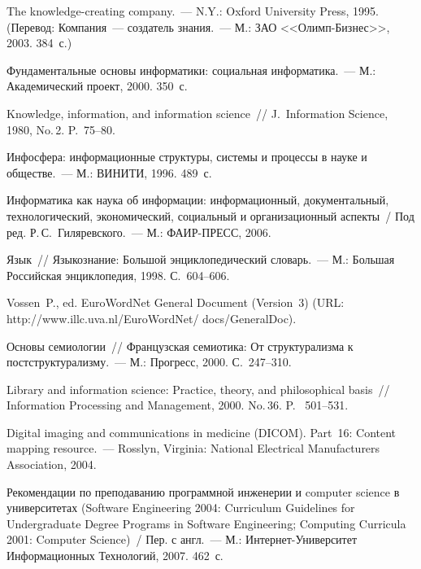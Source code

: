 \begin{multicols}{2}
{{\begin{thebibliography}{99}
     The knowledge-creating company.~--- N.Y.: Oxford University Press, 1995. (Перевод: 
     Компания~--- создатель знания.~--- М.: ЗАО <<Олимп-Бизнес>>, 2003. 384~с.)

     Фундаментальные основы информатики: социальная информатика.~--- М.:
Академический проект, 2000. 350~с.

     Knowledge, information, and information science~// J.\ Information Science, 1980, No.\,2.
     P.~75--80.

     Инфосфера: информационные структуры, системы и процессы в науке и обществе.~--- М.:
\mbox{ВИНИТИ}, 1996. 489~с.

     Информатика как наука об информации: ин\-фор\-ма\-ци\-он\-ный, документальный,
технологический, эконо\-ми\-че\-ский, социальный и организационный
аспекты~/ Под ред.
Р.\,С.~Гиляревского.~--- М.: ФАИР-ПРЕСС, 2006.

     Язык~// Языкознание: Большой эн\-цик\-ло\-пе\-ди\-че\-ский словарь.~--- М.: Большая Российская
энциклопедия, 1998. С.~604--606.

     Vossen~P., ed.
     EuroWordNet General Document (Version~3) (URL: {\sf
http://www.illc.uva.nl/EuroWordNet/ docs/GeneralDoc}).

     Основы семиологии~// Французская семиотика: От структурализма к
постструктурализму.~--- М.: Прогресс, 2000. С.~247--310.

     Library and information science: Practice, theory, and philosophical basis~// Information
Processing and Management, 2000. No.\,36. P.~ 501--531.

     Digital imaging and communications in medicine (\mbox{DICOM}). 
Part~16: Content mapping
resource.~--- Rosslyn, Virginia: National Electrical Manufacturers Association, 2004.

     Рекомендации по преподаванию программной инженерии и computer science в
университетах (Software Engineering 2004: Curriculum Guidelines for 
Un\-der\-grad\-u\-ate Degree Programs in Software Engineering; Com\-puting 
Curricula 2001: Computer Science)~/ Пер. с англ.~--- М.: 
Ин\-тер\-нет-Уни\-вер\-си\-тет Информационных Технологий, 2007. 462~с.


\end{thebibliography}}}
\end{multicols}
